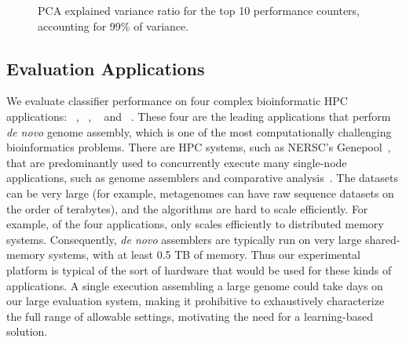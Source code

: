 \begin{figure}[t]
  \begin{centering}
    
    \caption{PCA explained variance ratio for the top 10 performance counters, accounting for 99\% of variance.}
    \label{fig:pca-evr}
  \end{centering}
\end{figure}


\subsection{Evaluation Applications}
\label{sec:setup-evaluation}

We evaluate classifier performance on four complex bioinformatic HPC applications: ~\cite{georganas2015hipmer}, ~\cite{peng2012idba}, ~\cite{li2015megahit} and ~\cite{nurk2016metaspades}.
These four are the leading applications that perform \emph{de novo} genome assembly, which is one of the most computationally challenging bioinformatics problems.
There are HPC systems, such as NERSC's Genepool~\cite{genepool}, that are predominantly used to concurrently execute many single-node applications, such as genome assemblers and comparative analysis~\cite{dosanjh2013extreme}.
The datasets can be very large (for example, metagenomes can have raw sequence datasets on the order of terabytes), and the algorithms are hard to scale efficiently.
For example, of the four applications, only  scales efficiently to distributed memory systems.
Consequently, \emph{de novo} assemblers are typically run on very large shared-memory systems, with at least 0.5 TB of memory.
Thus our experimental platform is typical of the sort of hardware that would be used for these kinds of applications.
A single execution assembling a large genome could take days on our large evaluation system, making it prohibitive to exhaustively characterize the full range of allowable settings, motivating the need for a learning-based solution.

